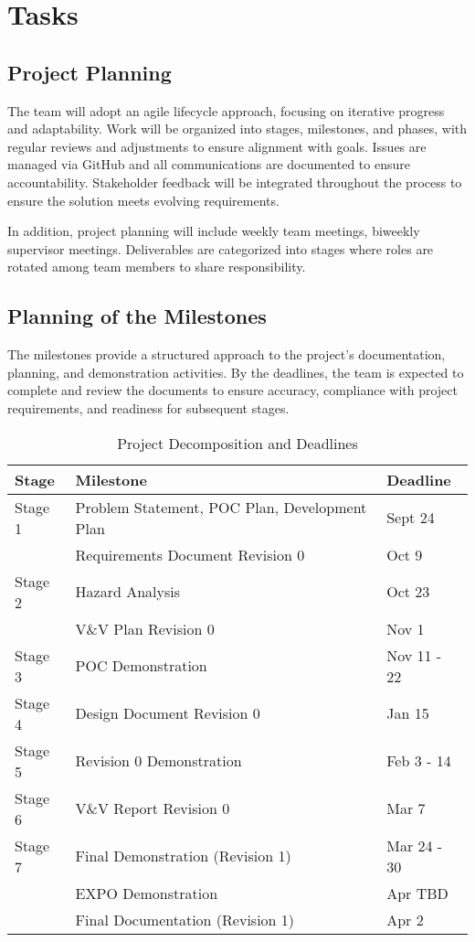 \documentclass[12pt]{article}
\begin{document}
\section{Tasks}

\subsection{Project Planning}

The team will adopt an agile lifecycle approach, focusing on iterative progress
and adaptability. Work will be organized into stages, milestones, and phases,
with regular reviews and adjustments to ensure alignment with goals. Issues are
managed via GitHub and all communications are documented to ensure
accountability. Stakeholder feedback will be integrated throughout the process
to ensure the solution meets evolving requirements.

In addition, project planning will include weekly team meetings, biweekly
supervisor meetings. Deliverables are categorized into stages where roles are
rotated among team members to share responsibility.

\subsection{Planning of the Milestones}

The milestones provide a structured approach to the project's documentation,
planning, and demonstration activities. By the deadlines, the team is expected
to complete and review the documents to ensure accuracy, compliance with project
requirements, and readiness for subsequent stages.

\newpage
\begin{table}[htbp]
  \centering
  \begin{tabular}{|l|l|l|}
  \hline
  \textbf{Stage} & \textbf{Milestone} & \textbf{Deadline} \\
  \hline
  Stage 1 & Problem Statement, POC Plan, Development Plan & Sept 24 \\
  \texttt{} & Requirements Document Revision 0 & Oct 9 \\
  \hline
  Stage 2 & Hazard Analysis & Oct 23 \\
  \texttt{} & V\&V Plan Revision 0 & Nov 1 \\
  \hline
  Stage 3 & POC Demonstration & Nov 11 - 22 \\
  \hline
  Stage 4 & Design Document Revision 0 & Jan 15 \\
  \hline
  Stage 5 & Revision 0 Demonstration & Feb 3 - 14\\
  \hline
  Stage 6 & V\&V Report Revision 0 & Mar 7 \\
  \hline
  Stage 7 & Final Demonstration (Revision 1) & Mar 24 - 30\\
  \texttt{} & EXPO Demonstration & Apr TBD \\
  \texttt{} & Final Documentation (Revision 1) & Apr 2 \\
  \hline
  \end{tabular}
  \caption{Project Decomposition and Deadlines}
  \label{table:2}
\end{table}
\end{document}
